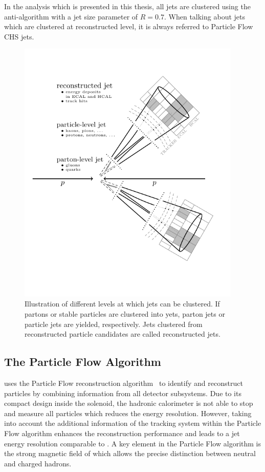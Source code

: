 In the analysis which is presented in this thesis, all jets are clustered using
the anti-\kt algorithm with a jet size parameter of $R=0.7$. When talking about
jets which are clustered at reconstructed level, it is always referred to
Particle Flow CHS jets.

\begin{figure}[h!tbp]
    \centering
    \includegraphics[width=0.95\textwidth]{figures/drawings/particlejet.pdf}
    \caption[Illustration of jet clustering levels]{Illustration of different
    levels at which jets can be clustered. If partons or stable particles are
clustered into yets, parton jets or particle jets are yielded, respectively.
Jets clustered from reconstructed particle candidates are called reconstructed
jets.}
    \label{fig:jet_levels}
\end{figure}


\subsection{The Particle Flow Algorithm}
\label{sec:particle_flow_algorithm}

\CMS uses the Particle Flow reconstruction
algorithm~\cite{CMS-PAS-PFT-09-001,CMS-PAS-PFT-10-001} to identify and
reconstruct particles by combining information from all detector
subsystems. Due to its compact design inside the solenoid, the hadronic
calorimeter is not able to stop and measure all particles which reduces the
energy resolution. However, taking into account the additional information of
the tracking system within the Particle Flow algorithm enhances the
reconstruction performance and leads to a jet energy resolution comparable to
\ATLAS. A key element in the Particle Flow algorithm is the strong magnetic field
of \CMS which allows the precise distinction between neutral and charged hadrons. 

